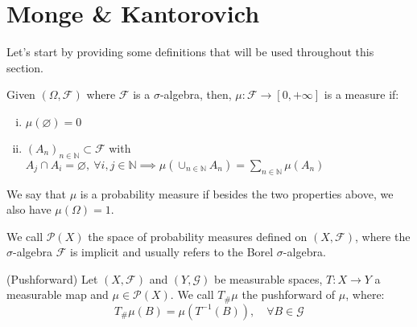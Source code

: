 \newpage
\section{Monge \& Kantorovich}

Let's start by providing some definitions that will be used throughout this section.
\begin{definition}
  Given $(\Omega,\mathcal F)$ where $\mathcal F$ is a $\sigma$-algebra,
  then, $\mu: \mathcal F \to [0,+\infty]$ is a measure if:
  \begin{enumerate}[i)]
    \item $\mu(\varnothing)=0$
    \item $(A_n)_{n\in \mathbb N} \subset \mathcal F$ with
          $A_j \cap A_i = \varnothing ,\ \forall i,j \in \mathbb N\implies
            \mu(\cup_{n \in \mathbb N}A_n) = \sum_{n \in \mathbb N}\mu(A_n)$
  \end{enumerate}
  We say that $\mu$ is a probability measure if besides the two
  properties above, we also have $\mu(\Omega) = 1$.
\end{definition}

\begin{definition}
  We call $\mathcal P(X)$ the space of probability measures defined
  on $(X,\mathcal F)$, where the $\sigma$-algebra $\mathcal F$
  is implicit and usually refers to the Borel $\sigma$-algebra.
\end{definition}

\begin{definition}(Pushforward)
  Let $(X,\mathcal F)$ and $(Y, \mathcal G)$ be measurable spaces, $T : X \to Y$ a measurable map
  and $\mu \in \mathcal P(X)$. We call $T_\# \mu$ the
  pushforward of $\mu$, where:
  \begin{equation}
    T_\#\mu(B) = \mu(T^{-1}(B)),\quad \forall B \in \mathcal G
  \end{equation}
\end{definition}

